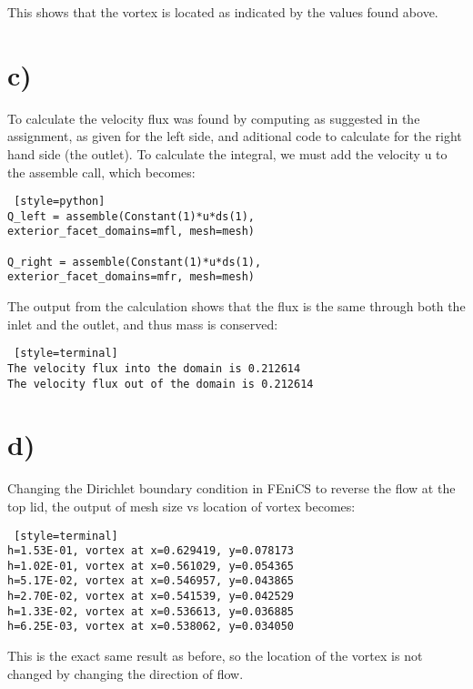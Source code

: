 \documentclass[a4paper,english,11pt,twoside]{article}
\begin{document}
This shows that the vortex is located as indicated by the values found above.

\section*{c)}
To calculate the velocity flux was found by computing as suggested in the assignment, as given for the left side, and aditional code to calculate for the right hand side (the outlet). To calculate the integral, we must add the velocity u to the assemble call, which becomes:\\
\begin{lstlisting} [style=python]
Q_left = assemble(Constant(1)*u*ds(1), 
exterior_facet_domains=mfl, mesh=mesh)

Q_right = assemble(Constant(1)*u*ds(1), 
exterior_facet_domains=mfr, mesh=mesh)
\end{lstlisting}
The output from the calculation shows that the flux is the same through both the inlet and the outlet, and thus mass is conserved:
\begin{lstlisting} [style=terminal]
The velocity flux into the domain is 0.212614 
The velocity flux out of the domain is 0.212614 
\end{lstlisting}
\newpage
\section*{d)}
Changing the Dirichlet boundary condition in FEniCS to reverse the flow at the top lid, the output of mesh size vs location of vortex becomes:
\begin{lstlisting} [style=terminal]
h=1.53E-01, vortex at x=0.629419, y=0.078173
h=1.02E-01, vortex at x=0.561029, y=0.054365
h=5.17E-02, vortex at x=0.546957, y=0.043865
h=2.70E-02, vortex at x=0.541539, y=0.042529
h=1.33E-02, vortex at x=0.536613, y=0.036885
h=6.25E-03, vortex at x=0.538062, y=0.034050
\end{lstlisting}
This is the exact same result as before, so the location of the vortex is not changed by changing the direction of flow.\\
\end{document}
